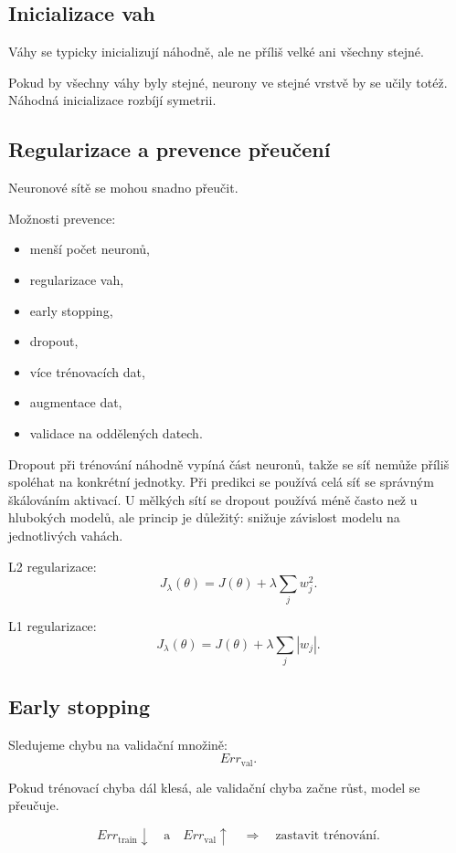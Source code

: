 \subsection{Inicializace vah}

Váhy se typicky inicializují náhodně, ale ne příliš velké ani všechny stejné.

Pokud by všechny váhy byly stejné, neurony ve stejné vrstvě by se učily totéž. Náhodná inicializace rozbíjí
symetrii.

\subsection{Regularizace a prevence přeučení}

Neuronové sítě se mohou snadno přeučit.

Možnosti prevence:
\begin{itemize}
    \item menší počet neuronů,
    \item regularizace vah,
    \item early stopping,
    \item dropout,
    \item více trénovacích dat,
    \item augmentace dat,
    \item validace na oddělených datech.
\end{itemize}

Dropout při trénování náhodně vypíná část neuronů, takže se síť nemůže příliš spoléhat na konkrétní jednotky.
Při predikci se používá celá síť se správným škálováním aktivací. U mělkých sítí se dropout používá méně
často než u hlubokých modelů, ale princip je důležitý: snižuje závislost modelu na jednotlivých vahách.

L2 regularizace:
\[
J_{\lambda}(\theta)
=
J(\theta)
+
\lambda
\sum_j w_j^2.
\]

L1 regularizace:
\[
J_{\lambda}(\theta)
=
J(\theta)
+
\lambda
\sum_j |w_j|.
\]

\subsection{Early stopping}

Sledujeme chybu na validační množině:
\[
Err_{\text{val}}.
\]

Pokud trénovací chyba dál klesá, ale validační chyba začne růst, model se přeučuje.

\[
Err_{\text{train}}\downarrow
\quad
\text{a}
\quad
Err_{\text{val}}\uparrow
\quad
\Rightarrow
\quad
\text{zastavit trénování}.
\]

